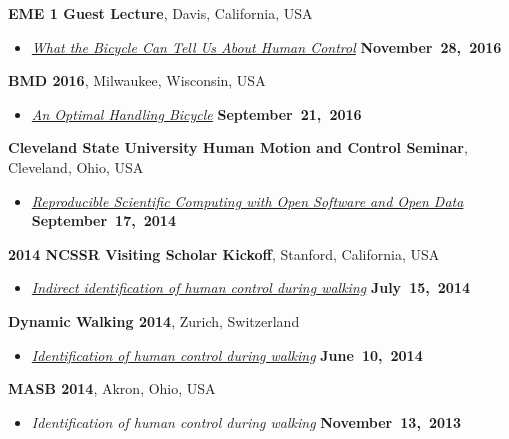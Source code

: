 \documentclass[10pt]{article}
\newenvironment{outerlist}[1][\enskip\textbullet]%
        {\begin{itemize}[#1]}{\end{itemize}%
         \vspace{-.6\baselineskip}}
\newcommand{\blankline}{\quad\pagebreak[2]}
\begin{document}
\blankline

\textbf{EME 1 Guest Lecture}, Davis, California, USA
\begin{outerlist}
\item[]
  \href{http://www.moorepants.info/presentations/2016/EME001/#/}{\textit{What
    the Bicycle Can Tell Us About Human Control}}
    \hfill \textbf{November~28,~2016}
\end{outerlist}

\blankline

\textbf{BMD 2016}, Milwaukee, Wisconsin, USA
\begin{outerlist}
\item[]
  \href{http://www.moorepants.info/presentations/2016/BMD2016/}{\textit{
    An Optimal Handling Bicycle}}
    \hfill \textbf{September~21,~2016}
\end{outerlist}

\blankline

\textbf{Cleveland State University Human Motion and Control Seminar}, Cleveland, Ohio, USA
\begin{outerlist}
\item[]
  \href{http://www.moorepants.info/presentations/2014/csu-fall-hmc-seminar}{\textit{Reproducible
    Scientific Computing with Open Software and Open Data}}
    \hfill \textbf{September~17,~2014}
\end{outerlist}

\blankline

\textbf{2014 NCSSR Visiting Scholar Kickoff}, Stanford, California, USA
\begin{outerlist}
\item[]
  \href{http://www.moorepants.info/presentations/2014/ncssr-kickoff}{\textit{Indirect
      identification of human control during walking}}
    \hfill \textbf{July~15,~2014}
\end{outerlist}

\blankline

\textbf{Dynamic Walking 2014}, Zurich, Switzerland
\begin{outerlist}
\item[]
  \href{http://www.moorepants.info/presentations/2014/DW2014}{\textit{Identification
  of human control during walking}}
    \hfill \textbf{June~10,~2014}
\end{outerlist}

\blankline

\textbf{MASB 2014}, Akron, Ohio, USA
\begin{outerlist}
\item[] \textit{Identification of human control during walking}
    \hfill \textbf{November~13,~2013}
\end{outerlist}
\end{document}
